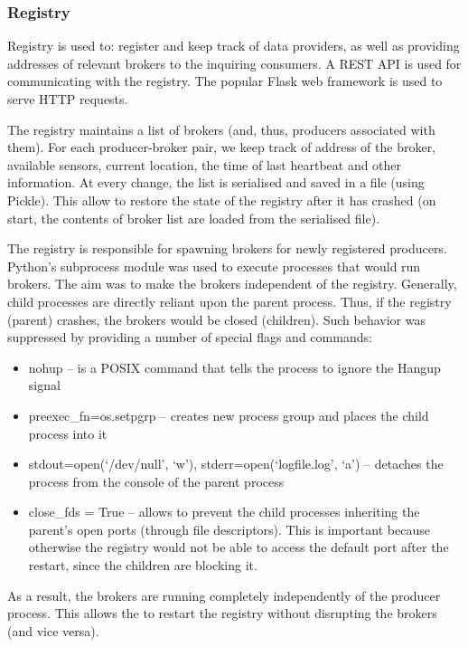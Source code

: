 \subsubsection{Registry}\label{registry-1}

Registry is used to: register and keep track of data providers, as well
as providing addresses of relevant brokers to the inquiring consumers. A
REST API is used for communicating with the registry. The popular Flask
web framework is used to serve HTTP requests.

The registry maintains a list of brokers (and, thus, producers
associated with them). For each producer-broker pair, we keep track of
address of the broker, available sensors, current location, the time of
last heartbeat and other information. At every change, the list is
serialised and saved in a file (using Pickle). This allow to restore the
state of the registry after it has crashed (on start, the contents of
broker list are loaded from the serialised file).

The registry is responsible for spawning brokers for newly registered
producers. Python's subprocess module was used to execute processes that
would run brokers. The aim was to make the brokers independent of the
registry. Generally, child processes are directly reliant upon the
parent process. Thus, if the registry (parent) crashes, the brokers
would be closed (children). Such behavior was suppressed by providing a
number of special flags and commands:

\begin{itemize}
\itemsep1pt\parskip0pt
\item
  nohup -- is a POSIX command that tells the process to ignore the
  Hangup signal
\item
  preexec\_fn=os.setpgrp -- creates new process group and places the
  child process into it
\item
  stdout=open(`/dev/null', `w'), stderr=open(`logfile.log', `a') --
  detaches the process from the console of the parent process
\item
  close\_fds = True -- allows to prevent the child processes inheriting
  the parent's open ports (through file descriptors). This is important
  because otherwise the registry would not be able to access the default
  port after the restart, since the children are blocking it.
\end{itemize}

As a result, the brokers are running completely independently of the
producer process. This allows the to restart the registry without
disrupting the brokers (and vice versa).

